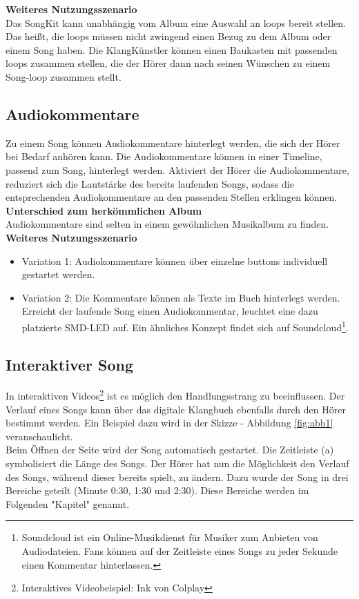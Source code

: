 \textbf{Weiteres Nutzungsszenario}\\
Das SongKit kann unabhängig vom Album eine Auswahl an \gls{loop}s bereit stellen. Das heißt, die \gls{loop}s müssen nicht zwingend einen Bezug zu dem Album oder einem Song haben. Die KlangKünstler können einen Baukasten mit passenden \gls{loop}s zusammen stellen, die der Hörer dann nach seinen Wünschen zu einem Song-\gls{loop} zusammen stellt.





\subsection{Audiokommentare}
Zu einem Song können Audiokommentare hinterlegt werden, die sich der Hörer bei Bedarf anhören kann. Die Audiokommentare können in einer Timeline, passend zum Song, hinterlegt werden. Aktiviert der Hörer die Audiokommentare, reduziert sich die Lautstärke des bereits laufenden Songs, sodass die entsprechenden Audiokommentare an den passenden Stellen erklingen können. \\


\textbf{Unterschied zum herkömmlichen Album}\\
Audiokommentare sind selten in einem gewöhnlichen Musikalbum zu finden.\\


\textbf{Weiteres Nutzungsszenario}
\begin{itemize}
\item Variation 1: Audiokommentare können über einzelne \gls{button}s individuell gestartet werden.
\item Variation 2: Die Kommentare können als Texte im Buch hinterlegt werden. Erreicht der laufende Song einen Audiokommentar, leuchtet eine dazu platzierte SMD-LED auf. Ein ähnliches Konzept findet sich auf Soundcloud\footnote{Soundcloud ist ein Online-Musikdienst für Musiker zum Anbieten von Audiodateien. Fans können auf der Zeitleiste eines Songs zu jeder Sekunde einen Kommentar hinterlassen.}.
\end{itemize}




\subsection{Interaktiver Song}
In interaktiven Videos\footnote{Interaktives Videobeispiel: Ink von Colplay\cite{CO}} ist es möglich den Handlungsstrang zu beeinflussen. Der Verlauf eines Songs kann über das digitale Klangbuch ebenfalls durch den Hörer bestimmt werden. Ein Beispiel dazu wird in der Skizze - Abbildung \ref{fig:abb1} veranschaulicht.\\
Beim Öffnen der Seite wird der Song automatisch gestartet. Die Zeitleiste (a) symbolisiert die Länge des Songs. Der Hörer hat nun die Möglichkeit den Verlauf des Songs, während dieser bereits spielt, zu ändern. Dazu wurde der Song in drei Bereiche geteilt (Minute 0:30, 1:30 und 2:30). Diese Bereiche werden im Folgenden "Kapitel" genannt.\\ 

